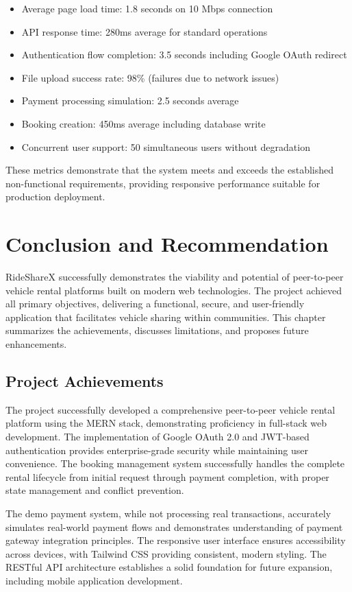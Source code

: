\documentclass[12pt,a4paper]{report}
\begin{document}
	\begin{itemize}
		\item Average page load time: 1.8 seconds on 10 Mbps connection
		\item API response time: 280ms average for standard operations
		\item Authentication flow completion: 3.5 seconds including Google OAuth redirect
		\item File upload success rate: 98\% (failures due to network issues)
		\item Payment processing simulation: 2.5 seconds average
		\item Booking creation: 450ms average including database write
		\item Concurrent user support: 50 simultaneous users without degradation
	\end{itemize}
	
	These metrics demonstrate that the system meets and exceeds the established non-functional requirements, providing responsive performance suitable for production deployment.
	
	\chapter{Conclusion and Recommendation}
	
	RideShareX successfully demonstrates the viability and potential of peer-to-peer vehicle rental platforms built on modern web technologies. The project achieved all primary objectives, delivering a functional, secure, and user-friendly application that facilitates vehicle sharing within communities. This chapter summarizes the achievements, discusses limitations, and proposes future enhancements.
	
	\section{Project Achievements}
	
	The project successfully developed a comprehensive peer-to-peer vehicle rental platform using the MERN stack, demonstrating proficiency in full-stack web development. The implementation of Google OAuth 2.0 and JWT-based authentication provides enterprise-grade security while maintaining user convenience. The booking management system successfully handles the complete rental lifecycle from initial request through payment completion, with proper state management and conflict prevention.
	
	The demo payment system, while not processing real transactions, accurately simulates real-world payment flows and demonstrates understanding of payment gateway integration principles. The responsive user interface ensures accessibility across devices, with Tailwind CSS providing consistent, modern styling. The RESTful API architecture establishes a solid foundation for future expansion, including mobile application development.
	
\end{document}
